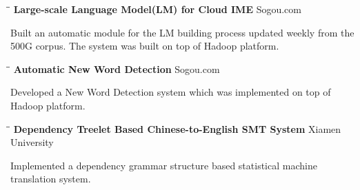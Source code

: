 \documentclass{res}
\begin{document}
\begin{resume}
   \vspace{-0.1in}
   \begin{tabbing}
   \hspace{2in}\= \hspace{3in}\= \kill %
    {\bf Large-scale Language Model(LM) for Cloud IME} \> \>Sogou.com     \\
   \end{tabbing}\vspace{-30pt}      %
   Built an automatic module for the LM building process updated weekly from the 500G corpus. The system was built on top of Hadoop platform. %
   \vspace{-0.1in}
   \begin{tabbing}
   \hspace{2in}\= \hspace{3in}\= \kill %
    {\bf Automatic New Word Detection}\> \>Sogou.com     \\
   \end{tabbing}\vspace{-30pt}      %
   Developed a New Word Detection system which was implemented on top of Hadoop platform.\\
   \vspace{-0.1in}
   \begin{tabbing}
   \hspace{2in}\= \hspace{3in}\= \kill %
    {\bf Dependency Treelet Based Chinese-to-English SMT System} \> \>Xiamen University\\
   \end{tabbing}\vspace{-30pt}      %
   Implemented a dependency grammar structure based statistical machine translation system. \\
   \vspace{-0.1in}

\end{resume}
\end{document}
